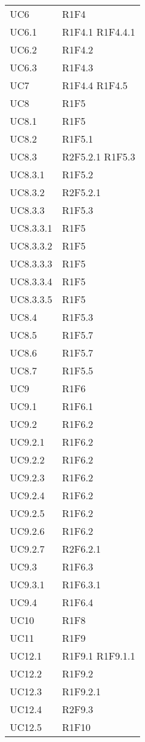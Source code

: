 {\begin{longtable}{C{4cm} C{11.5cm}}
UC6 & R1F4 \\
UC6.1 & R1F4.1 \quad R1F4.4.1\\
UC6.2 & R1F4.2 \\
UC6.3 & R1F4.3 \\

UC7 & R1F4.4 \quad R1F4.5 \\

UC8 & R1F5 \\
UC8.1 & R1F5 \\
UC8.2 & R1F5.1 \\
UC8.3 & R2F5.2.1 \quad R1F5.3\\
UC8.3.1 & R1F5.2 \\
UC8.3.2 & R2F5.2.1 \\
UC8.3.3 & R1F5.3 \\
UC8.3.3.1 & R1F5 \\
UC8.3.3.2 & R1F5 \\
UC8.3.3.3 & R1F5 \\
UC8.3.3.4 & R1F5 \\
UC8.3.3.5 & R1F5 \\
UC8.4 & R1F5.3 \\
UC8.5 & R1F5.7 \\
UC8.6 & R1F5.7 \\
UC8.7 & R1F5.5 \\

UC9 & R1F6 \\
UC9.1 & R1F6.1 \\
UC9.2 & R1F6.2 \\
UC9.2.1 & R1F6.2 \\
UC9.2.2 & R1F6.2 \\
UC9.2.3 & R1F6.2 \\
UC9.2.4 & R1F6.2 \\
UC9.2.5 & R1F6.2 \\
UC9.2.6 & R1F6.2 \\
UC9.2.7 & R2F6.2.1 \\
UC9.3 & R1F6.3 \\
UC9.3.1 & R1F6.3.1 \\
UC9.4 & R1F6.4 \\

UC10 & R1F8 \\

UC11 & R1F9 \\

UC12.1 & R1F9.1 \quad R1F9.1.1 \\
UC12.2 & R1F9.2 \\
UC12.3 & R1F9.2.1 \\
UC12.4 & R2F9.3 \\
UC12.5 & R1F10 \\


\end{longtable}}
